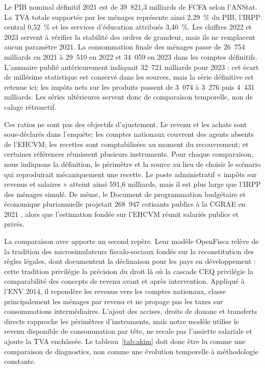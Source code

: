 \documentclass[11pt,a4paper]{article}
\begin{document}
Le PIB nominal définitif 2021 est de 39~821,3 milliards de FCFA selon l'ANStat.
La TVA totale supportée par les ménages représente ainsi 2,29~\% du PIB, l'IRPP
central 0,52~\% et les services d'éducation attribués 3,40~\%. Les chiffres
2022 et 2023 servent à vérifier la stabilité des
ordres de grandeur, mais ils ne remplacent aucun paramètre 2021. La consommation
finale des ménages passe de 26~754 milliards en 2021 à 29~510 en 2022 et
34~059 en 2023 dans les comptes définitifs. L'annuaire publié antérieurement
indiquait 32~721 milliards pour 2023 : cet écart de millésime statistique est
conservé dans les sources, mais la série définitive est retenue ici; les impôts
nets sur les produits passent de 3~074 à 3~276 puis
4~431 milliards. Les séries ultérieures servent donc de comparaison temporelle,
non de calage rétroactif.

Ces ratios ne sont pas des objectifs d'ajustement. Le revenu et les achats sont
sous-déclarés dans l'enquête; les comptes nationaux couvrent des agents absents
de l'EHCVM; les recettes sont comptabilisées au moment du recouvrement; et
certaines références réunissent plusieurs instruments. Pour chaque comparaison,
nous indiquons la définition, le périmètre et la source au lieu de choisir le
scénario qui reproduirait mécaniquement une recette. Le poste administratif
« impôts sur revenus et salaires » atteint ainsi 591,6 milliards, mais il est
plus large que l'IRPP des ménages simulé. De même, le Document de programmation
budgétaire et économique pluriannuelle projetait 268~947 cotisants publics à la
CGRAE en 2021 \citep{civdpbep2021}, alors que l'estimation fondée sur l'EHCVM réunit salariés
publics et privés.

La comparaison avec \citet{akim2020} apporte un second repère. Leur modèle
OpenFisca relève de la tradition des microsimulateurs fiscalo-sociaux fondés sur
la reconstitution des règles légales, dont \citet{decoster2019} documentent la
déclinaison pour les pays en développement : cette tradition privilégie la
précision du droit là où la cascade CEQ privilégie la comparabilité des concepts
de revenu avant et après intervention. Appliqué à l'ENV 2014, il
repondère les revenus vers les comptes nationaux,
classe principalement les ménages par revenu et ne propage pas les taxes sur
consommations intermédiaires. L'ajout des accises, droits de douane et
transferts directs rapproche les périmètres d'instruments, mais notre
modèle utilise le revenu disponible de consommation par tête, ne recale pas
l'assiette salariale et ajoute la TVA enchâssée. Le tableau~\ref{tab:akim} doit
donc être lu comme une comparaison de diagnostics, non comme une évolution
temporelle à méthodologie constante.
\end{document}
